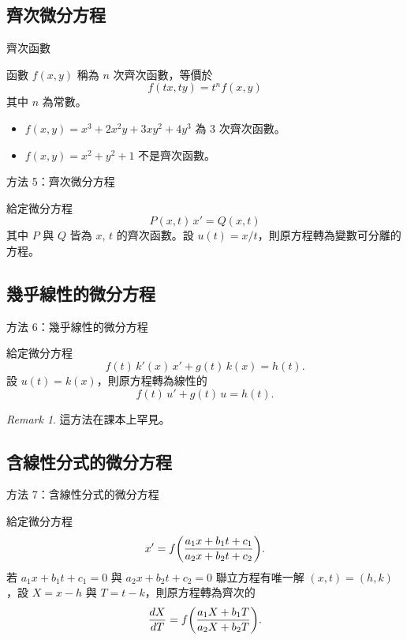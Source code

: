 \documentclass{beamer}
\newcommand{\Left} {\mathopen{}\mathclose\bgroup\left}
\newcommand{\Right}{\aftergroup\egroup\right}
\theoremstyle{remark}
\newtheorem{remark}{Remark}
\begin{document}
\begin{CJK}{UTF8}{bsmi}
\subsection[齊次]{齊次微分方程}
\begin{frame}{齊次函數}
  \begin{definition}
    函數 $f(x,y)$ 稱為 $n$ 次齊次函數，等價於
    \begin{equation}
      f(tx,ty) = t^n f(x,y) \label{eq:Homogeneity}
    \end{equation}
    其中 $n$ 為常數。
  \end{definition}
  \begin{example}
    \begin{itemize}
      \item $f(x,y) = x^3 + 2x^2y + 3xy^2 + 4y^3$ 為 3 次齊次函數。
      \item $f(x,y) = x^2 + y^2 + 1$ 不是齊次函數。
    \end{itemize}
  \end{example}
\end{frame}

\begin{frame}{方法 5：齊次微分方程}
  \begin{theorem}
    給定微分方程
    \[P(x,t)\,x' = Q(x,t)\]
    其中 $P$ 與 $Q$ 皆為 $x$, $t$ 的齊次函數。設 $u(t) = x/t$，則原方程轉為變數可分離的方程。
  \end{theorem}
\end{frame}

\subsection[幾乎線性]{幾乎線性的微分方程}
\begin{frame}{方法 6：幾乎線性的微分方程}
  \begin{theorem}
    給定微分方程
    \[f(t)\,k'(x)\,x' + g(t)\,k(x) = h(t).\]
    設 $u(t) = k(x)$，則原方程轉為線性的
    \[f(t)\,u' + g(t)\,u = h(t).\]
  \end{theorem}
  \begin{remark}
    這方法在課本上罕見。
  \end{remark}
\end{frame}

\subsection[含線性分式]{含線性分式的微分方程}
\begin{frame}{方法 7：含線性分式的微分方程}
  \begin{theorem}
    給定微分方程
    \[x' = f \Left( \frac{a_1 x + b_1 t + c_1}{a_2 x + b_2 t + c_2} \Right).\]
    若 $a_1 x + b_1 t + c_1 = 0$ 與 $a_2 x + b_2 t + c_2 = 0$ 聯立方程有唯一解
    $(x,t) = (h,k)$，設 $X = x-h$ 與 $T = t-k$，則原方程轉為齊次的
    \[\frac{dX}{dT} = f \Left( \frac{a_1 X + b_1 T}{a_2 X + b_2 T} \Right).\]
  \end{theorem}
\end{frame}


\end{CJK}
\end{document}

